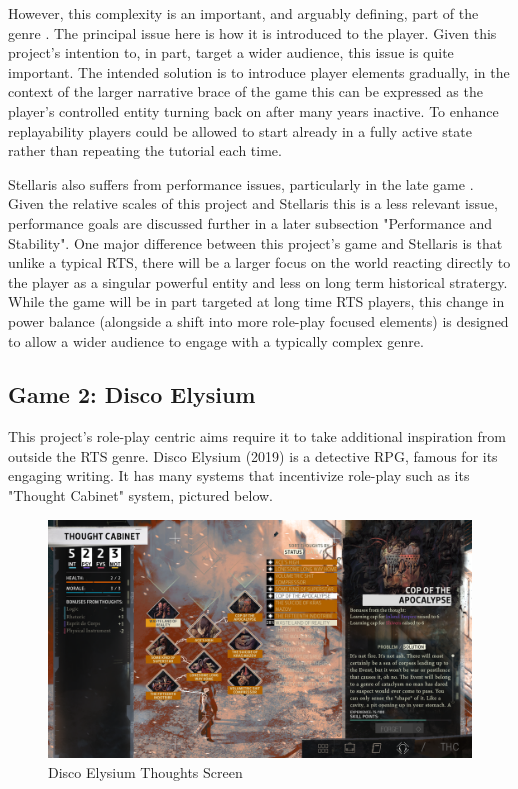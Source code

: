 \documentclass{report}
\begin{document}
However, this complexity is an important, and arguably defining, part of the genre \cite{rtsUncertainty}. The principal issue here is how it is introduced to the player. Given this project's intention to, in part, target a wider audience, this issue is quite important. The intended solution is to introduce player elements gradually, in the context of the larger narrative brace of the game this can be expressed as the player's controlled entity turning back on after many years inactive. To enhance replayability players could be allowed to start already in a fully active state rather than repeating the tutorial each time.

Stellaris also suffers from performance issues, particularly in the late game \cite{stellarisPerformanceReview1} \cite{stellarisPerformanceReview2}. Given the relative scales of this project and Stellaris this is a less relevant issue, performance goals are discussed further in a later subsection "Performance and Stability".
\newline
\newline
One major difference between this project's game and Stellaris is that unlike a typical RTS, there will be a larger focus on the world reacting directly to the player as a singular powerful entity and less on long term historical stratergy. While the game will be in part targeted at long time RTS players, this change in power balance (alongside a shift into more role-play focused elements) is designed to allow a wider audience to engage with a typically complex genre. 

\subsection{Game 2: Disco Elysium}

This project's role-play centric aims require it to take additional inspiration from outside the RTS genre. Disco Elysium (2019) \cite{discoelysium} is a detective RPG, famous for its engaging writing. It has many systems that incentivize  role-play such as its "Thought Cabinet" system, pictured below.

\begin{figure}[H]
    \includegraphics[width=\textwidth]{disco_elysium_thoughts_screen.png}
    \caption{Disco Elysium Thoughts Screen}
\end{figure}
\end{document}
